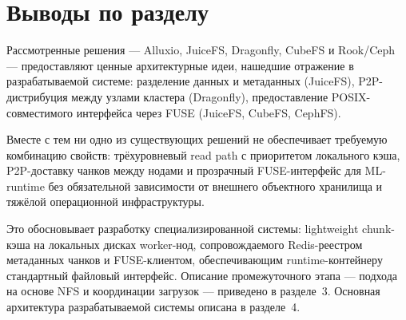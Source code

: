 \section{Выводы по разделу}

Рассмотренные решения --- Alluxio, JuiceFS, Dragonfly, CubeFS и Rook/Ceph --- предоставляют ценные архитектурные идеи, нашедшие отражение в разрабатываемой системе: разделение данных и метаданных (JuiceFS), P2P-дистрибуция между узлами кластера (Dragonfly), предоставление POSIX-совместимого интерфейса через FUSE (JuiceFS, CubeFS, CephFS).

Вместе с тем ни одно из существующих решений не обеспечивает требуемую комбинацию свойств: трёхуровневый read path с приоритетом локального кэша, P2P-доставку чанков между нодами и прозрачный FUSE-интерфейс для ML-runtime без обязательной зависимости от внешнего объектного хранилища и тяжёлой операционной инфраструктуры.

Это обосновывает разработку специализированной системы: lightweight chunk-кэша на локальных дисках worker-нод, сопровождаемого Redis-реестром метаданных чанков и FUSE-клиентом, обеспечивающим runtime-контейнеру стандартный файловый интерфейс. Описание промежуточного этапа --- подхода на основе NFS и координации загрузок --- приведено в разделе~3. Основная архитектура разрабатываемой системы описана в разделе~4.

